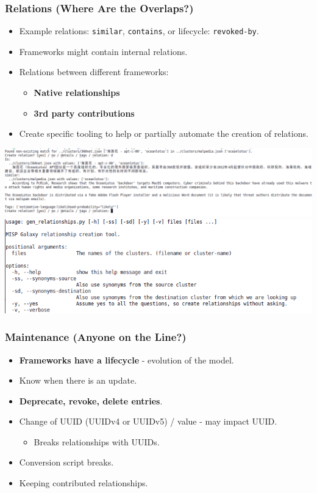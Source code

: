 \begin{frame}
        \frametitle{Relations (Where Are the Overlaps?)}
        \begin{itemize}
            \item Example relations: \texttt{similar}, \texttt{contains}, or lifecycle: \texttt{revoked-by}.
            \item Frameworks might contain internal relations.
            \item Relations between different frameworks:
            \begin{itemize}
                \item \textbf{Native relationships}
                \item \textbf{3rd party contributions}
            \end{itemize}
            \item Create specific tooling to help or partially automate the creation of relations.
        \end{itemize}
        \begin{center}
        \includegraphics[scale=0.2]{./screenshots/rel-gen-example.png}
        \includegraphics[scale=0.2]{./screenshots/rel-gen-help.png}
        \end{center}
\end{frame}

\begin{frame}
        \frametitle{Maintenance (Anyone on the Line?)}
        \begin{itemize}
		\item {\bf Frameworks have a lifecycle} - evolution of the model.
            \item Know when there is an update.
	    \item {\bf Deprecate, revoke, delete entries}.
            \item Change of UUID (UUIDv4 or UUIDv5) / value - may impact UUID.
                \begin{itemize}
                    \item Breaks relationships with UUIDs.
                \end{itemize}
            \item Conversion script breaks.
            \item Keeping contributed relationships.
        \end{itemize}
\end{frame}

